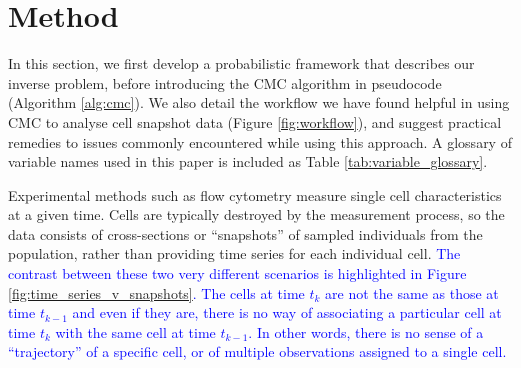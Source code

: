 \section{Method}\label{sec:method}
In this section, we first develop a probabilistic framework that describes our inverse problem, before introducing the CMC algorithm in pseudocode (Algorithm \ref{alg:cmc}). We also detail the workflow we have found helpful in using CMC to analyse cell snapshot data (Figure \ref{fig:workflow}), and suggest practical remedies to issues commonly encountered while using this approach. A glossary of variable names used in this paper is included as Table \ref{tab:variable_glossary}.

Experimental methods such as flow cytometry measure single cell characteristics at a given time. Cells are typically destroyed by the measurement process, so the data consists of cross-sections or ``snapshots'' of sampled individuals from the population, rather than providing time series for each individual cell. \textcolor{blue}{The contrast between these two very different scenarios is highlighted in Figure \ref{fig:time_series_v_snapshots}. The cells at time $t_k$ are not the same as those at time $t_{k-1}$ and even if they are, there is no way of associating a particular cell at time $t_k$ with the same cell at time $t_{k-1}$. In other words, there is no sense of a ``trajectory'' of a specific cell, or of multiple observations assigned to a single cell.}


